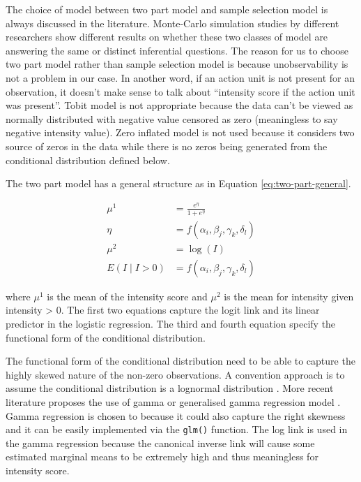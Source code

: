 \documentclass{monashthesis}
\begin{document}
The choice of model between two part model and sample selection model is always discussed in the literature. Monte-Carlo simulation studies by different researchers \autocites{leung1996choice}{duan1984choosing}{manning1987monte} show different results on whether these two classes of model are answering the same or distinct inferential questions. The reason for us to choose two part model rather than sample selection model is because unobservability is not a problem in our case. In another word, if an action unit is not present for an observation, it doesn't make sense to talk about ``intensity score if the action unit was present''. Tobit model is not appropriate because the data can't be viewed as normally distributed with negative value censored as zero (meaningless to say negative intensity value). Zero inflated model is not used because it considers two source of zeros in the data while there is no zeros being generated from the conditional distribution defined below.

The two part model has a general structure as in Equation \ref{eq:two-part-general}.

\begin{align}\label{eq:two-part-general}
\mu^1 &= \frac{e^{\eta}}{1 + e^{\eta}} \\
\eta &= f(\alpha_i, \beta_j, \gamma_k, \delta_l) \\
\mu^2 &= \log(I) \\
E(I \mid I > 0) &= f(\alpha_i, \beta_j, \gamma_k, \delta_l)
\end{align}

\noindent where \(\mu^1\) is the mean of the intensity score and \(\mu^2\) is the mean for intensity given intensity \textgreater{} 0. The first two equations capture the logit link and its linear predictor in the logistic regression. The third and fourth equation specify the functional form of the conditional distribution.

The functional form of the conditional distribution need to be able to capture the highly skewed nature of the non-zero observations. A convention approach is to assume the conditional distribution is a lognormal distribution \autocite{diehr1999methods}. More recent literature proposes the use of gamma or generalised gamma regression model \autocite{twopart2010}. Gamma regression is chosen to because it could also capture the right skewness and it can be easily implemented via the \texttt{glm()} function. The log link is used in the gamma regression because the canonical inverse link will cause some estimated marginal means to be extremely high and thus meaningless for intensity score.
\end{document}
